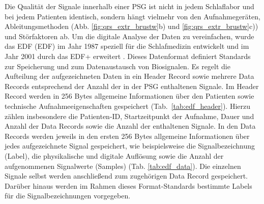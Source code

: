 Die Qualität der Signale innerhalb einer \acs{PSG} ist nicht in jedem Schlaflabor und bei jedem Patienten identisch, sondern hängt vielmehr von den Aufnahmegeräten, Ableitungsmethoden (Abb. \ref{fig:qrs_extr_brustw}b) und \ref{fig:qrs_extr_brustw}c)) und Störfaktoren ab. Um die digitale Analyse der Daten zu vereinfachen, wurde das \acl{EDF} (\acs{EDF}) im Jahr 1987 speziell für die Schlafmedizin entwickelt und im Jahr 2001 durch das EDF+ erweitert \parencite{kemp_european_????}. Dieses Datenformat definiert Standards zur Speicherung und zum Datenaustausch von Biosignalen. Es regelt die Aufteilung der aufgezeichneten Daten in ein Header Record sowie mehrere Data Records entsprechend der Anzahl der in der \acs{PSG} enthaltenen Signale. Im Header Record werden in 256 Bytes allgemeine Informationen über den Patienten sowie technische Aufnahmeeigenschaften gespeichert (Tab.~\ref{tab:edf_header}). Hierzu zählen insbesondere die Patienten-ID, Startzeitpunkt der Aufnahme, Dauer und Anzahl der Data Records sowie die Anzahl der enthaltenen Signale. In den Data Records werden jeweils in den ersten 256 Bytes allgemeine Informationen über jedes aufgezeichnete Signal gespeichert, wie beispielsweise die Signalbezeichnung (Label), die physikalische und digitale Auflösung sowie die Anzahl der aufgenommenen Signalwerte (Samples) (Tab. \ref{tab:edf_data}). Die einzelnen Signale selbst werden anschließend zum zugehörigen Data Record gespeichert. Darüber hinaus werden im Rahmen dieses Format-Standards bestimmte Labels für die Signalbezeichnungen vorgegeben. \parencite{kemp_european_2003}

